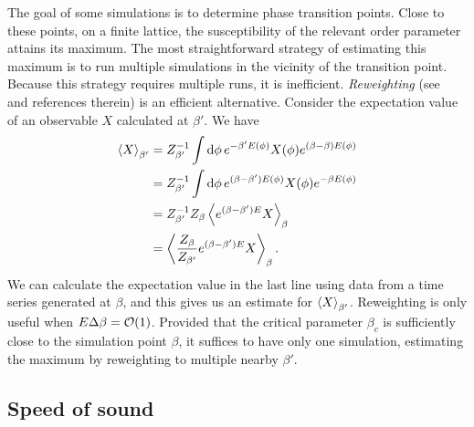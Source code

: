 The goal of some simulations is to determine phase transition points. 
Close to these points, on a finite lattice, the susceptibility of the 
relevant order parameter attains its maximum. The most straightforward
strategy of estimating this maximum is to run multiple simulations
in the vicinity of the transition point. Because this strategy
requires multiple runs, it is inefficient.
{\it Reweighting} (see~\cite{ferrenberg_new_1989} and
references therein) is an efficient alternative. Consider
the expectation value of an observable $X$ calculated at $\beta'$. We have
\begin{equation}\label{eq:RW}
\begin{aligned}
  \ev{X}_{\beta'}&=Z_{\beta'}^{-1}\int\dd{\phi}e^{-\beta'E(\phi)}X(\phi)
                  e^{(\beta-\beta)E(\phi)}\\
                 &=Z_{\beta'}^{-1}\int\dd{\phi}e^{(\beta-\beta')E(\phi)}
                  X(\phi)e^{-\beta E(\phi)}\\
                 &=Z_{\beta'}^{-1}Z_{\beta}\ev{e^{(\beta-\beta')E}X}_\beta\\
                 &=\ev{\frac{Z_\beta}{Z_{\beta'}}e^{(\beta-\beta')E}X}_\beta.
\end{aligned}
\end{equation}
We can calculate the expectation value in the last line
using data from a time series generated at $\beta$, and this gives us an
estimate for $\ev{X}_{\beta'}$. Reweighting is only useful when
$E\Delta\beta=\order{1}$. Provided that the critical parameter $\beta_c$
is sufficiently close to the simulation point $\beta$, it suffices
to have only one simulation, estimating the maximum by reweighting to
multiple nearby $\beta'$.


\subsection{Speed of sound}


